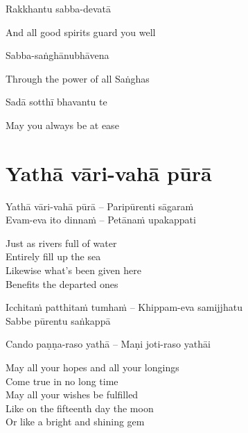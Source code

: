 Rakkhantu sabba-devatā

\begin{english}
  And all good spirits guard you well
\end{english}

Sabba-saṅghānubhāvena

\begin{english}
  Through the power of all Saṅghas
\end{english}

Sadā sotthī bhavantu te

\begin{english}
  May you always be at ease
\end{english}



\setsecheadstyle{\subsectionFmt}
\section{Yathā vāri-vahā pūrā}
\label{yatha-vari-vaha-pura}

\vspace{-0.6em}

\begin{twochants}
  Yathā vāri-vahā pūrā – Paripūrenti sāgaraṁ\\
  Evam-eva ito dinnaṁ – Petānaṁ upakappati
\end{twochants}

\begin{english-verses}
  Just as rivers full of water\\
  Entirely fill up the sea\\
  Likewise what's been given here\\
  Benefits the departed ones\hyperlink{endnote117-appendix}{\hypertarget{endnote117-body}{}}
\end{english-verses}

\suttaRef{[Khp 1.7]}

\begin{pali-hangtogether}
  Icchitaṁ patthitaṁ tumhaṁ – Khippam-eva samijjhatu\\
  Sabbe pūrentu saṅkappā
\end{pali-hangtogether}
  Cando paṇṇa-raso yathā – Maṇi joti-raso yathāi

\begin{english-verses}
  May all your hopes and all your longings\\
  Come true in no long time\\
  May all your wishes be fulfilled\\
  Like on the fifteenth day the moon\\
  Or like a bright and shining gem
\end{english-verses}

